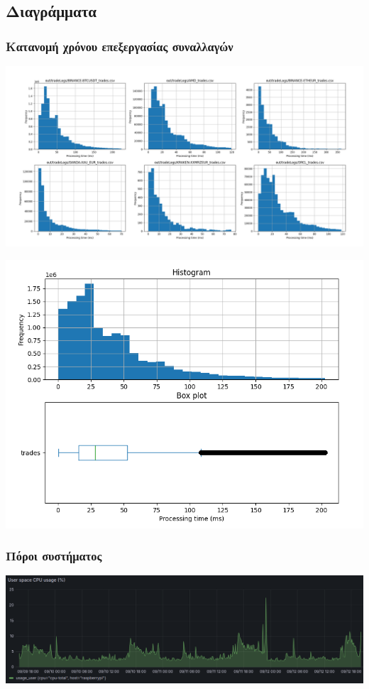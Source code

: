 \documentclass[11pt]{article}
\begin{document}
\subsection{Διαγράμματα}
\label{sec:org4e5323e}
\subsubsection{Κατανομή χρόνου επεξεργασίας συναλλαγών}
\label{sec:org17eb4d1}
\begin{center}
\includegraphics[width=0.95\linewidth]{./images/histogram-per-symbol.png}
\end{center}

\begin{center}
\includegraphics[width=0.5\linewidth]{./images/histogram-boxplot.png}
\end{center}
\subsubsection{Πόροι συστήματος}
\label{sec:orge8288f5}
\begin{center}
\includegraphics[width=0.7\linewidth]{./images/cpu-usage.png}
\end{center}
\end{document}
